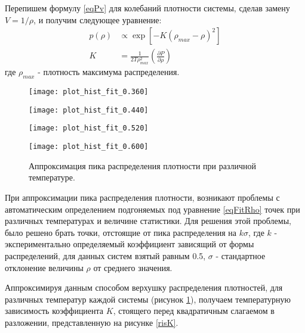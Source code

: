 Перепишем формулу \ref{eqPv} для колебаний плотности системы, сделав замену $V = 1 / \rho$, и получим следующее уравнение:
\begin{equation}
\begin{aligned}
p(\rho) &\varpropto \exp \left[ - K \left(\rho_{max}- \rho \right)^2 \right] \\
K &= \frac{1}{2T\rho_{max}^2} \left( \frac{\partial P}{\partial \rho} \right)
\end{aligned}
\label{eqFitRho}
\end{equation}
где $\rho_{max}$ - плотность максимума распределения.

\begin{figure}[htbp!]
\begin{center}
\begin{minipage}[h]{0.45\linewidth}
\texttt{[image: plot\_hist\_fit\_0.360]}
\end{minipage}
\begin{minipage}[h]{0.45\linewidth}
\texttt{[image: plot\_hist\_fit\_0.440]}
\end{minipage}

\begin{minipage}[h]{0.45\linewidth}
\texttt{[image: plot\_hist\_fit\_0.520]}
\end{minipage}
\begin{minipage}[h]{0.45\linewidth}
\texttt{[image: plot\_hist\_fit\_0.600]}
\end{minipage}
\caption{Аппроксимация пика распределения плотности при различной температуре.}
\label{risHistFit}
\end{center}
\end{figure}

При аппроксимации пика распределения плотности, возникают проблемы с автоматическим определением подгоняемых под уравнение \ref{eqFitRho} точек при различных температурах и величине статистики. Для решения этой проблемы, было решено брать точки, отстоящие от пика распределения на $k\sigma$, где $k$ - экспериментально определяемый коэффициент зависящий от формы распределений, для данных систем взятый равным 0.5, $\sigma$ - стандартное отклонение величины $\rho$ от среднего значения.  

Аппроксимируя данным способом верхушку распределения плотностей, для различных температур каждой системы (рисунок \ref{risHistFit}), получаем температурную зависимость коэффициента $K$, стоящего перед квадратичным слагаемом в разложении, представленную на рисунке \ref{risK}.

